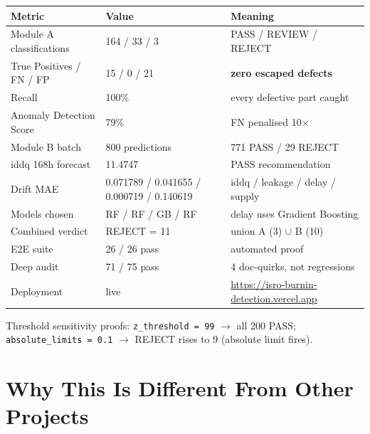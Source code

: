 \documentclass[11pt,a4paper]{article}
\newcommand{\code}[1]{\texttt{\small #1}}
\begin{document}
\begin{center}
\begin{tabular}{@{}lll@{}}
\toprule
\textbf{Metric} & \textbf{Value} & \textbf{Meaning}\\
\midrule
Module A classifications & 164 / 33 / 3 & PASS / REVIEW / REJECT\\
True Positives / FN / FP & 15 / 0 / 21 & \textbf{zero escaped defects}\\
Recall & 100\% & every defective part caught\\
Anomaly Detection Score & 79\% & FN penalised 10$\times$\\
Module B batch & 800 predictions & 771 PASS / 29 REJECT\\
iddq 168h forecast & 11.4747 & PASS recommendation\\
Drift MAE & 0.071789 / 0.041655 / 0.000719 / 0.140619 & iddq / leakage / delay / supply\\
Models chosen & RF / RF / GB / RF & delay uses Gradient Boosting\\
Combined verdict & REJECT = 11 & union A (3) $\cup$ B (10)\\
E2E suite & 26 / 26 pass & automated proof\\
Deep audit & 71 / 75 pass & 4 doc-quirks, not regressions\\
Deployment & live & \url{https://isro-burnin-detection.vercel.app}\\
\bottomrule
\end{tabular}
\end{center}

\noindent Threshold sensitivity proofs: \code{z\_threshold = 99} $\rightarrow$ all 200 PASS;
\code{absolute\_limits = 0.1} $\rightarrow$ REJECT rises to 9 (absolute limit fires).

\section{Why This Is Different From Other Projects}
\end{document}

